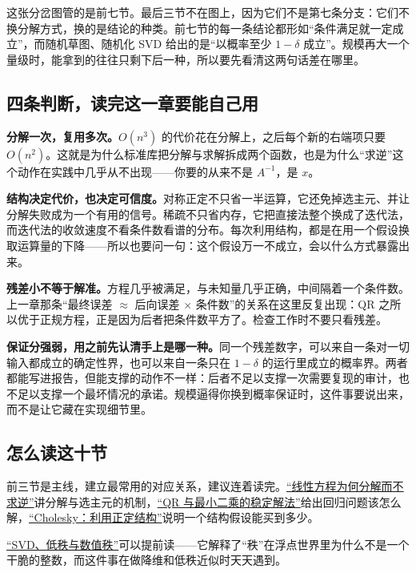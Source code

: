 这张分岔图管的是前七节。最后三节不在图上，因为它们不是第七条分支：它们不换分解方式，换的是结论的种类。前七节的每一条结论都形如``条件满足就一定成立''，而随机草图、随机化 SVD 给出的是``以概率至少 \(1-\delta\) 成立''。规模再大一个量级时，能拿到的往往只剩下后一种，所以要先看清这两句话差在哪里。

\subsection{四条判断，读完这一章要能自己用}

\textbf{分解一次，复用多次。}\(O(n^3)\) 的代价花在分解上，之后每个新的右端项只要 \(O(n^2)\)。这就是为什么标准库把分解与求解拆成两个函数，也是为什么``求逆''这个动作在实践中几乎从不出现——你要的从来不是 \(A^{-1}\)，是 \(x\)。

\textbf{结构决定代价，也决定可信度。}对称正定不只省一半运算，它还免掉选主元、并让分解失败成为一个有用的信号。稀疏不只省内存，它把直接法整个换成了迭代法，而迭代法的收敛速度不看条件数看谱的分布。每次利用结构，都是在用一个假设换取运算量的下降——所以也要问一句：这个假设万一不成立，会以什么方式暴露出来。

\textbf{残差小不等于解准。}方程几乎被满足，与未知量几乎正确，中间隔着一个条件数。上一章那条``最终误差 \(\approx\) 后向误差 \(\times\) 条件数''的关系在这里反复出现：QR 之所以优于正规方程，正是因为后者把条件数平方了。检查工作时不要只看残差。

\textbf{保证分强弱，用之前先认清手上是哪一种。}同一个残差数字，可以来自一条对一切输入都成立的确定性界，也可以来自一条只在 \(1-\delta\) 的运行里成立的概率界。两者都能写进报告，但能支撑的动作不一样：后者不足以支撑一次需要复现的审计，也不足以支撑一个最坏情况的承诺。规模逼得你换到概率保证时，这件事要说出来，而不是让它藏在实现细节里。

\subsection{怎么读这十节}

前三节是主线，建立最常用的对应关系，建议连着读完。\hyperref[sec:08-Numerical-Analysis/05-Numerical-Linear-Algebra/01]{``线性方程为何分解而不求逆''}讲分解与选主元的机制，\hyperref[sec:08-Numerical-Analysis/05-Numerical-Linear-Algebra/02]{``QR 与最小二乘的稳定解法''}给出回归问题该怎么解，\hyperref[sec:08-Numerical-Analysis/05-Numerical-Linear-Algebra/03]{``Cholesky：利用正定结构''}说明一个结构假设能买到多少。

\hyperref[sec:08-Numerical-Analysis/05-Numerical-Linear-Algebra/06]{``SVD、低秩与数值秩''}可以提前读——它解释了``秩''在浮点世界里为什么不是一个干脆的整数，而这件事在做降维和低秩近似时天天遇到。

